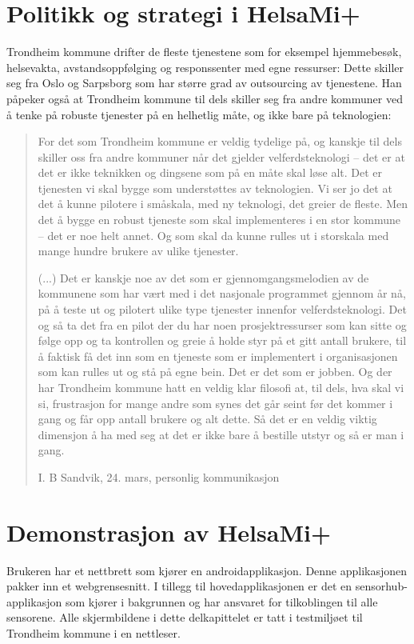 \section{Politikk og strategi i HelsaMi+}
Trondheim kommune drifter de fleste tjenestene som for eksempel hjemmebesøk, helsevakta, avstandsoppfølging og responssenter med egne ressurser:
Dette skiller seg fra Oslo og Sarpsborg som har større grad av outsourcing av tjenestene. Han påpeker også at Trondheim kommune til dels skiller
seg fra andre kommuner ved å tenke på robuste tjenester på en helhetlig måte, og ikke bare på teknologien:
\blockquote[I. B Sandvik, 24. mars, personlig kommunikasjon]{For det som Trondheim kommune er
    veldig tydelige på, og kanskje til dels skiller oss fra andre kommuner når det gjelder velferdsteknologi -- det er at det er ikke teknikken og dingsene som på en måte skal
    løse alt. Det er tjenesten vi skal bygge som understøttes av teknologien.
    Vi ser jo det at det å kunne pilotere i småskala, med ny teknologi, det greier de fleste. Men det å bygge en robust tjeneste som skal
    implementeres i en stor kommune
-- det er noe helt annet. Og som skal da kunne rulles ut i storskala med mange hundre brukere av ulike tjenester.

(...) Det er kanskje noe av det som er gjennomgangsmelodien av de kommunene som har vært med i det nasjonale programmet gjennom år nå, på å teste ut
og pilotert ulike type tjenester innenfor velferdsteknologi. Det og så ta det fra en pilot der du har noen prosjektressurser som kan sitte
og følge opp og ta kontrollen og greie å holde styr på
et gitt antall brukere, til å faktisk få det inn som en tjeneste som er implementert i organisasjonen som kan rulles ut og stå på egne bein.
Det er det som er jobben. Og der har Trondheim kommune hatt en veldig klar filosofi at, til dels, hva skal vi si, frustrasjon for mange
andre som synes det går seint før det kommer i gang og får
 opp antall brukere og alt dette. Så det er en veldig viktig dimensjon å ha med seg at det er ikke bare å bestille utstyr og så er man i gang.
 }

\section{Demonstrasjon av HelsaMi+}
Brukeren har et nettbrett som kjører en androidapplikasjon. Denne applikasjonen pakker inn
et webgrensesnitt. I tillegg til hovedapplikasjonen er det en sensorhub-applikasjon som kjører i bakgrunnen
og har ansvaret for tilkoblingen til alle sensorene. Alle skjermbildene i dette delkapittelet er tatt i testmiljøet
til Trondheim kommune i en nettleser.

